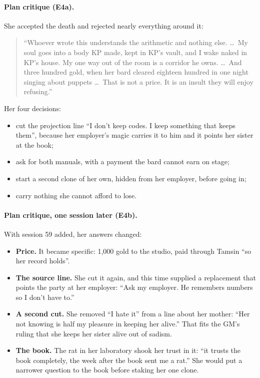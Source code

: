 \documentclass[11pt]{article}
\begin{document}
\paragraph{Plan critique (E4a).} She accepted the death and rejected nearly everything
around it:
\begin{quote}\small
``Whoever wrote this understands the arithmetic and nothing else. \ldots\ My soul goes into a
body KP made, kept in KP's vault, and I wake naked in KP's house. My one way out of the room
is a corridor he owns. \ldots\ And three hundred gold, when her bard cleared eighteen hundred
in one night singing about puppets \ldots\ That is not a price. It is an insult they will
enjoy refusing.''
\end{quote}
Her four decisions:
\begin{itemize}[nosep]
\item cut the projection line ``I don't keep codes. I keep something that keeps them'',
because her employer's magic carries it to him and it points her sister at the book;
\item ask for both manuals, with a payment the bard cannot earn on stage;
\item start a second clone of her own, hidden from her employer, before going in;
\item carry nothing she cannot afford to lose.
\end{itemize}

\paragraph{Plan critique, one session later (E4b).} With session 59 added, her answers
changed:
\begin{itemize}[nosep]
\item \textbf{Price.} It became specific: 1{,}000 gold to the studio, paid through Tamsin
``so her record holds''.
\item \textbf{The source line.} She cut it again, and this time supplied a replacement that
points the party at her employer: ``Ask my employer. He remembers numbers so I don't have
to.''
\item \textbf{A second cut.} She removed ``I hate it'' from a line about her mother: ``Her
not knowing is half my pleasure in keeping her alive.'' That fits the GM's ruling that she
keeps her sister alive out of sadism.
\item \textbf{The book.} The rat in her laboratory shook her trust in it: ``it trusts the book
completely, the week after the book sent me a rat.'' She would put a narrower question to
the book before staking her one clone.
\end{itemize}
\end{document}
